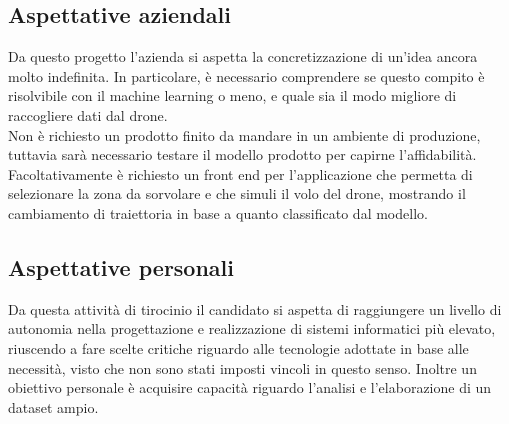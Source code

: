 \subsection{Aspettative aziendali}
Da questo progetto l'azienda si aspetta la concretizzazione di un'idea ancora molto indefinita. In particolare, è necessario comprendere se questo compito
è risolvibile con il machine learning o meno, e quale sia il modo migliore di raccogliere dati dal drone.\\
Non è richiesto un prodotto finito da mandare in un ambiente di produzione, tuttavia sarà necessario testare il modello prodotto per capirne l'affidabilità.\\
Facoltativamente è richiesto un front end per l'applicazione che permetta di selezionare la zona da sorvolare e che simuli il volo del drone, mostrando il cambiamento
di traiettoria in base a quanto classificato dal modello.

\subsection{Aspettative personali}
Da questa attività di tirocinio il candidato si aspetta di raggiungere un livello di autonomia nella progettazione e realizzazione di sistemi informatici più elevato,
riuscendo a fare scelte critiche riguardo alle tecnologie adottate in base alle necessità, visto che non sono stati imposti vincoli in questo senso.
Inoltre un obiettivo personale è acquisire capacità riguardo l'analisi e l'elaborazione di un dataset ampio.
\newpage

